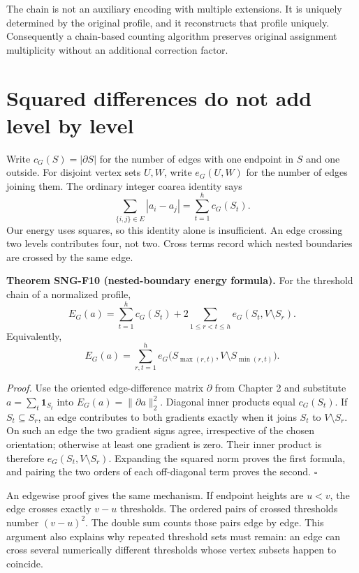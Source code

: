 \documentclass[
  11pt,
  a4paper,
]{report}
\begin{document}
The chain is not an auxiliary encoding with multiple extensions. It is
uniquely determined by the original profile, and it reconstructs that
profile uniquely. Consequently a chain-based counting algorithm
preserves original assignment multiplicity without an additional
correction factor.

\hypertarget{squared-differences-do-not-add-level-by-level}{%
\section{Squared differences do not add level by
level}\label{squared-differences-do-not-add-level-by-level}}

Write \(c_G(S)=|\partial S|\) for the number of edges with one endpoint
in \(S\) and one outside. For disjoint vertex sets \(U,W\), write
\(e_G(U,W)\) for the number of edges joining them. The ordinary integer
coarea identity says \[
\sum_{\{i,j\}\in E}|a_i-a_j|=\sum_{t=1}^h c_G(S_t).
\] Our energy uses squares, so this identity alone is insufficient. An
edge crossing two levels contributes four, not two. Cross terms record
which nested boundaries are crossed by the same edge.

\textbf{Theorem SNG-F10 (nested-boundary energy formula).} For the
threshold chain of a normalized profile, \[
E_G(a)=\sum_{t=1}^h c_G(S_t)
+2\sum_{1\le r<t\le h}e_G(S_t,V\setminus S_r).
\] Equivalently, \[
E_G(a)=\sum_{r,t=1}^h
e_G\bigl(S_{\max(r,t)},V\setminus S_{\min(r,t)}\bigr).
\]

\emph{Proof.} Use the oriented edge-difference matrix \(\partial\) from
Chapter 2 and substitute \(a=\sum_t\mathbf1_{S_t}\) into
\(E_G(a)=\|\partial a\|_2^2\). Diagonal inner products equal
\(c_G(S_t)\). If \(S_t\subseteq S_r\), an edge contributes to both
gradients exactly when it joins \(S_t\) to \(V\setminus S_r\). On such
an edge the two gradient signs agree, irrespective of the chosen
orientation; otherwise at least one gradient is zero. Their inner
product is therefore \(e_G(S_t,V\setminus S_r)\). Expanding the squared
norm proves the first formula, and pairing the two orders of each
off-diagonal term proves the second. \(\square\)

An edgewise proof gives the same mechanism. If endpoint heights are
\(u<v\), the edge crosses exactly \(v-u\) thresholds. The ordered pairs
of crossed thresholds number \((v-u)^2\). The double sum counts those
pairs edge by edge. This argument also explains why repeated threshold
sets must remain: an edge can cross several numerically different
thresholds whose vertex subsets happen to coincide.
\end{document}
